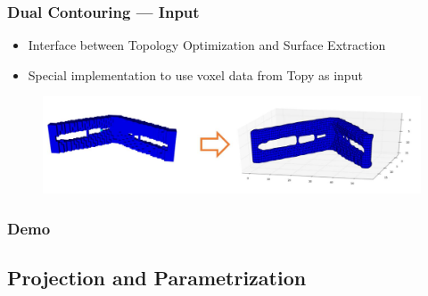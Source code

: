 \begin{frame}

	\frametitle{Dual Contouring --- Input}
	
	\begin{overlayarea}{\textwidth}{.25 \textheight}
	\begin{itemize}
	\item Interface between Topology Optimization and Surface Extraction
	\item Special implementation to use voxel data from Topy as input
	\end{itemize}
	\end{overlayarea}

	\begin{overlayarea}{\textwidth}{.75 \textheight}
	\begin{figure}
	\includegraphics[scale=0.35]{Pictures/DC/cantilever.pdf}
	\end{figure}
	\end{overlayarea}
	
\end{frame}

\begin{frame}

	\frametitle{Demo}
	

\end{frame}

\subsection{Projection and Parametrization}

